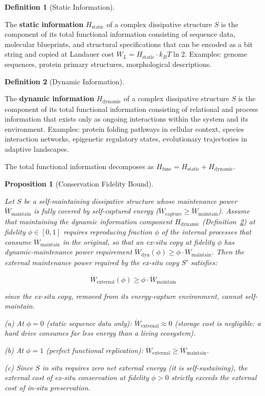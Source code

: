 \documentclass[11pt]{article}
\theoremstyle{plain}
\newtheorem{proposition}[theorem]{Proposition}
\theoremstyle{definition}
\newtheorem{definition}{Definition}
\theoremstyle{remark}
\begin{document}
\begin{definition}[Static Information]
\label{def-static-information}

The \textbf{static information} $H_{\text{static}}$ of a complex dissipative structure $S$ is the component of its total functional information consisting of sequence data, molecular blueprints, and structural specifications that can be encoded as a bit string and copied at Landauer cost $W_L = H_{\text{static}} \cdot k_B T \ln 2$. Examples: genome sequences, protein primary structures, morphological descriptions.
\end{definition}

\begin{definition}[Dynamic Information]
\label{def-dynamic-information}

The \textbf{dynamic information} $H_{\text{dynamic}}$ of a complex dissipative structure $S$ is the component of its total functional information consisting of relational and process information that exists only as ongoing interactions within the system and its environment. Examples: protein folding pathways in cellular context, species interaction networks, epigenetic regulatory states, evolutionary trajectories in adaptive landscapes.

The total functional information decomposes as $H_{\text{func}} = H_{\text{static}} + H_{\text{dynamic}}$.
\end{definition}

\begin{proposition}[Conservation Fidelity Bound]
\label{prop-conservation-fidelity-bound}

Let $S$ be a self-maintaining dissipative structure whose maintenance power $\dot{W}_{\text{maintain}}$ is fully covered by self-captured energy ($\dot{W}_{\text{capture}} \geq \dot{W}_{\text{maintain}}$). Assume that maintaining the dynamic information component $H_{\text{dynamic}}$ (Definition~\ref{def-dynamic-information}) at fidelity $\phi \in [0,1]$ requires reproducing fraction $\phi$ of the internal processes that consume $\dot{W}_{\text{maintain}}$ in the original, so that an ex-situ copy at fidelity $\phi$ has dynamic-maintenance power requirement $\dot{W}_{\text{dyn}}(\phi) \geq \phi \cdot \dot{W}_{\text{maintain}}$. Then the external maintenance power required by the ex-situ copy $S'$ satisfies:

$$\dot{W}_{\text{external}}(\phi) \geq \phi \cdot \dot{W}_{\text{maintain}}$$

since the ex-situ copy, removed from its energy-capture environment, cannot self-maintain.

(a) At $\phi = 0$ (static sequence data only): $\dot{W}_{\text{external}} \approx 0$ (storage cost is negligible: a hard drive consumes far less energy than a living ecosystem).

(b) At $\phi = 1$ (perfect functional replication): $\dot{W}_{\text{external}} \geq \dot{W}_{\text{maintain}}$.

(c) Since $S$ in situ requires zero net external energy (it is self-sustaining), the external cost of ex-situ conservation at fidelity $\phi > 0$ strictly exceeds the external cost of in-situ preservation.
\end{proposition}
\end{document}
